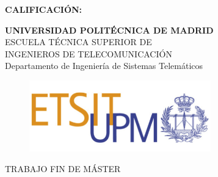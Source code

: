 {\large{\bf CALIFICACIÓN:}}
\pagestyle{empty}
\cleardoublepage
\vspace*{\baselineskip}
\begin{center}
	
	{\LARGE\rm\textbf{UNIVERSIDAD POLITÉCNICA DE MADRID}\\
	    \vspace{1.0cm}
	    ESCUELA TÉCNICA SUPERIOR DE\\ INGENIEROS DE TELECOMUNICACIÓN
	}   \\

	{\Large\rm Departamento de Ingeniería de Sistemas Telemáticos\\
	}  

    \begin{figure}[!htbp]
	    \centering
        \includegraphics[width=0.7\textwidth]{img/logo_etsit.jpg}
    \end{figure}
    
	\vspace{1.0cm}
    {\LARGE\rm TRABAJO FIN DE MÁSTER\\
	    \vspace{1.5cm}
        \MakeUppercase{ \textbf{\tfmtitlees} } \\ 
	} 
	\vspace{1.0cm}
    \Large\rm\textbf{\authorname}\\ 
    \vspace{1.0cm}
    \fecha
\end{center}  

\cleardoublepage

